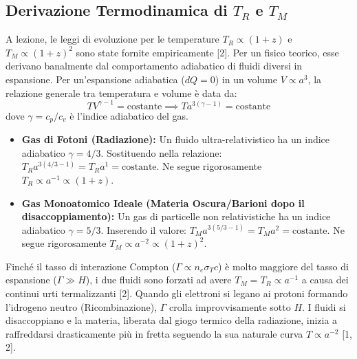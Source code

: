 \documentclass[11pt,a4paper]{report}
\begin{document}
\subsection{Derivazione Termodinamica di $T_R$ e $T_M$}
A lezione, le leggi di evoluzione per le temperature $T_R \propto (1+z)$ e $T_M \propto (1+z)^2$ sono state fornite empiricamente [2]. Per un fisico teorico, esse derivano banalmente dal comportamento adiabatico di fluidi diversi in espansione.
Per un'espansione adiabatica ($dQ=0$) in un volume $V \propto a^3$, la relazione generale tra temperatura e volume è data da:
\begin{equation}
T V^{\gamma-1} = \text{costante} \implies T a^{3(\gamma-1)} = \text{costante}
\end{equation}
dove $\gamma = c_p/c_v$ è l'indice adiabatico del gas.
\begin{itemize}
    \item \textbf{Gas di Fotoni (Radiazione):} Un fluido ultra-relativistico ha un indice adiabatico $\gamma = 4/3$. Sostituendo nella relazione: $T_R a^{3(4/3 - 1)} = T_R a^1 = \text{costante}$. Ne segue rigorosamente $T_R \propto a^{-1} \propto (1+z)$.
    \item \textbf{Gas Monoatomico Ideale (Materia Oscura/Barioni dopo il disaccoppiamento):} Un gas di particelle non relativistiche ha un indice adiabatico $\gamma = 5/3$. Inserendo il valore: $T_M a^{3(5/3 - 1)} = T_M a^2 = \text{costante}$. Ne segue rigorosamente $T_M \propto a^{-2} \propto (1+z)^2$.
\end{itemize}
Finché il tasso di interazione Compton ($\Gamma \propto n_e \sigma_T c$) è molto maggiore del tasso di espansione ($\Gamma \gg H$), i due fluidi sono forzati ad avere $T_M = T_R \propto a^{-1}$ a causa dei continui urti termalizzanti [2]. Quando gli elettroni si legano ai protoni formando l'idrogeno neutro (Ricombinazione), $\Gamma$ crolla improvvisamente sotto $H$. I fluidi si disaccoppiano e la materia, liberata dal giogo termico della radiazione, inizia a raffreddarsi drasticamente più in fretta seguendo la sua naturale curva $T \propto a^{-2}$ [1, 2].
\end{document}
